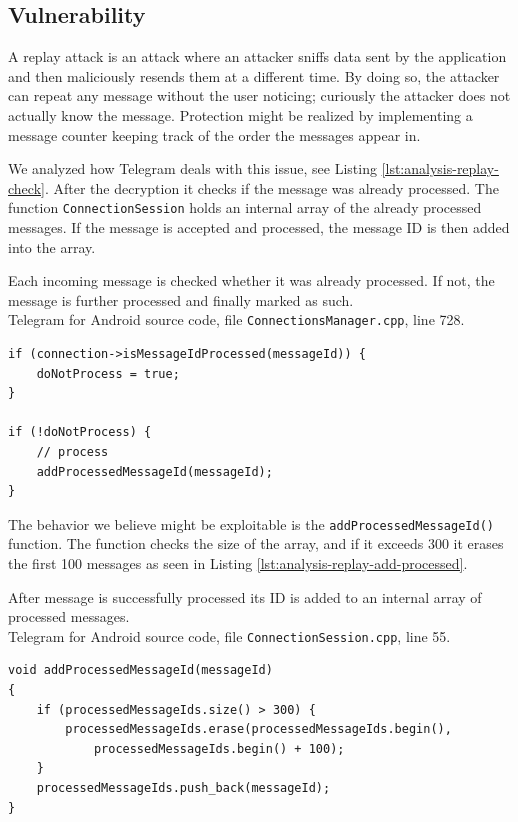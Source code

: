 \documentclass[thesis=M,english]{FITthesis}[2012/10/20]
\begin{document}
\subsection{Vulnerability}

A replay attack is an attack where an attacker sniffs data sent by the application and then maliciously resends them at a different time. By doing so, the attacker can repeat any message without the user noticing; curiously the attacker does not actually know the message. Protection might be realized by implementing a message counter keeping track of the order the messages appear in.

We analyzed how Telegram deals with this issue, see Listing \ref{lst:analysis-replay-check}. After the decryption it checks if the message was already processed. The function \texttt{ConnectionSession} holds an internal array of the already processed messages. If the message is accepted and processed, the message ID is then added into the array.

\begin{listing}[htb]
\caption{Each incoming message is checked whether it was already processed. If not, the message is further processed and finally marked as such.
\protect\\ Telegram for Android source code, file \texttt{ConnectionsManager.cpp}, line 728.}
\label{lst:analysis-replay-check}
\begin{verbatim}
if (connection->isMessageIdProcessed(messageId)) {
    doNotProcess = true;
}

if (!doNotProcess) {
    // process
    addProcessedMessageId(messageId);
}
\end{verbatim}
\end{listing}


The behavior we believe might be exploitable is the \texttt{addProcessedMessageId()} function. The function checks the size of the array, and if it exceeds 300 it erases the first 100 messages as seen in Listing \ref{lst:analysis-replay-add-processed}.


\begin{listing}[htb]
\caption{After message is successfully processed its ID is added to an internal array of processed messages.
\protect\\ Telegram for Android source code, file \texttt{ConnectionSession.cpp}, line 55.}
\label{lst:analysis-replay-add-processed}
\begin{verbatim}
void addProcessedMessageId(messageId)
{
    if (processedMessageIds.size() > 300) {
        processedMessageIds.erase(processedMessageIds.begin(),
            processedMessageIds.begin() + 100);
    }
    processedMessageIds.push_back(messageId);
}
\end{verbatim}
\end{listing}
\end{document}

